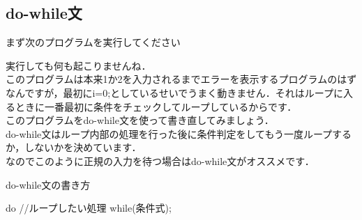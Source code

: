 \subsection{do-while文}
まず次のプログラムを実行してください

実行しても何も起こりませんね．\\
このプログラムは本来1か2を入力されるまでエラーを表示するプログラムのはずなんですが，最初にi=0;としているせいでうまく動きません．それはループに入るときに一番最初に条件をチェックしてループしているからです．\\
このプログラムをdo-while文を使って書き直してみましょう．\\

do-while文はループ内部の処理を行った後に条件判定をしてもう一度ループするか，しないかを決めています．\\
なのでこのように正規の入力を待つ場合はdo-while文がオススメです．\\
\begin{itembox}{do-while文の書き方}
\begin{verbatimtab}
do{
	//ループしたい処理
}while(条件式);
\end{verbatimtab}
\end{itembox}

